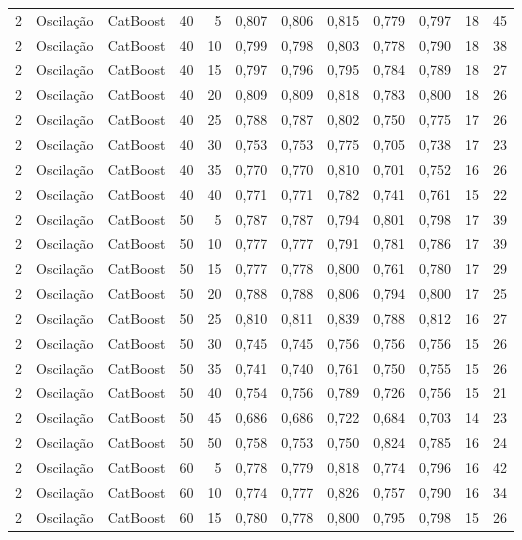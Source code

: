 \begin{longtable}{@{}rllrrrrrrrrr@{}}
2 & Oscilação & CatBoost & 40 & 5 & 0,807 & 0,806 & 0,815 & 0,779 & 0,797 & 18 & 45 \\
2 & Oscilação & CatBoost & 40 & 10 & 0,799 & 0,798 & 0,803 & 0,778 & 0,790 & 18 & 38 \\
2 & Oscilação & CatBoost & 40 & 15 & 0,797 & 0,796 & 0,795 & 0,784 & 0,789 & 18 & 27 \\
2 & Oscilação & CatBoost & 40 & 20 & 0,809 & 0,809 & 0,818 & 0,783 & 0,800 & 18 & 26 \\
2 & Oscilação & CatBoost & 40 & 25 & 0,788 & 0,787 & 0,802 & 0,750 & 0,775 & 17 & 26 \\
2 & Oscilação & CatBoost & 40 & 30 & 0,753 & 0,753 & 0,775 & 0,705 & 0,738 & 17 & 23 \\
2 & Oscilação & CatBoost & 40 & 35 & 0,770 & 0,770 & 0,810 & 0,701 & 0,752 & 16 & 26 \\
2 & Oscilação & CatBoost & 40 & 40 & 0,771 & 0,771 & 0,782 & 0,741 & 0,761 & 15 & 22 \\
2 & Oscilação & CatBoost & 50 & 5 & 0,787 & 0,787 & 0,794 & 0,801 & 0,798 & 17 & 39 \\
2 & Oscilação & CatBoost & 50 & 10 & 0,777 & 0,777 & 0,791 & 0,781 & 0,786 & 17 & 39 \\
2 & Oscilação & CatBoost & 50 & 15 & 0,777 & 0,778 & 0,800 & 0,761 & 0,780 & 17 & 29 \\
2 & Oscilação & CatBoost & 50 & 20 & 0,788 & 0,788 & 0,806 & 0,794 & 0,800 & 17 & 25 \\
2 & Oscilação & CatBoost & 50 & 25 & 0,810 & 0,811 & 0,839 & 0,788 & 0,812 & 16 & 27 \\
2 & Oscilação & CatBoost & 50 & 30 & 0,745 & 0,745 & 0,756 & 0,756 & 0,756 & 15 & 26 \\
2 & Oscilação & CatBoost & 50 & 35 & 0,741 & 0,740 & 0,761 & 0,750 & 0,755 & 15 & 26 \\
2 & Oscilação & CatBoost & 50 & 40 & 0,754 & 0,756 & 0,789 & 0,726 & 0,756 & 15 & 21 \\
2 & Oscilação & CatBoost & 50 & 45 & 0,686 & 0,686 & 0,722 & 0,684 & 0,703 & 14 & 23 \\
2 & Oscilação & CatBoost & 50 & 50 & 0,758 & 0,753 & 0,750 & 0,824 & 0,785 & 16 & 24 \\
2 & Oscilação & CatBoost & 60 & 5 & 0,778 & 0,779 & 0,818 & 0,774 & 0,796 & 16 & 42 \\
2 & Oscilação & CatBoost & 60 & 10 & 0,774 & 0,777 & 0,826 & 0,757 & 0,790 & 16 & 34 \\
2 & Oscilação & CatBoost & 60 & 15 & 0,780 & 0,778 & 0,800 & 0,795 & 0,798 & 15 & 26 \\

\end{longtable}
